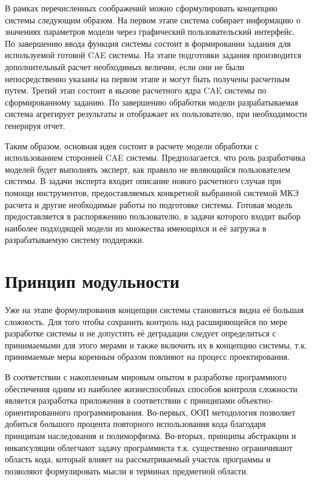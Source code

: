 \documentclass[14pt,oneside,final]{extreport}
\begin{document}
	В рамках перечисленных соображений можно сформулировать концепцию системы следующим образом. На первом этапе система собирает информацию о значениях параметров модели через графический пользовательский интерфейс. По завершению ввода функция системы состоит в формировании задания для используемой готовой CAE системы. На этапе подготовки задания производится дополнительный расчет необходимых величин, если они не были непосредственно указаны на первом этапе и могут быть получены расчетным путем. Третий этап состоит в вызове расчетного ядра CAE системы по сформированному заданию. По завершению обработки модели разрабатываемая система агрегирует результаты и отображает их пользователю, при необходимости генерируя отчет.

	Таким образом, основная идея состоит в расчете модели обработки с использованием сторонней CAE системы. Предполагается, что роль разработчика моделей будет выполнять эксперт, как правило не являющийся пользователем системы. В задачи эксперта входит описание нового расчетного случая при помощи инструментов, предоставляемых конкретной выбранной системой МКЭ расчета и другие необходимые работы по подготовке системы. Готовая модель предоставляется в распоряжению пользователю, в задачи которого входит выбор наиболее подходящей модели из множества имеющихся и её загрузка в разрабатываемую систему поддержки.

	\section{Принцип модульности}
	Уже на этапе формулирования концепции системы становиться видна её большая сложность. Для того чтобы сохранить контроль над расширяющейся по мере разработке системы и не допустить её деградации следует определиться с принимаемыми для этого мерами и также включить их в концепцию системы, т.к. принимаемые меры коренным образом повлияют на процесс проектирования. 
	
	В соответствии с накопленным мировым опытом в разработке программного обеспечения одним из наиболее жизнеспособных способов контроля сложности является разработка приложения в соответствии с принципами  объектно-ориентированного программирования. Во-первых,  ООП методология позволяет добиться большого процента повторного использования кода благодаря принципам наследования и полиморфизма. Во-вторых, принципы абстракции и инкапсуляции облегчают задачу программиста т.к. существенно ограничивают область кода, который влияет на рассматриваемый участок программы и позволяют формулировать мысли в терминах предметной области. 
	
\end{document}
